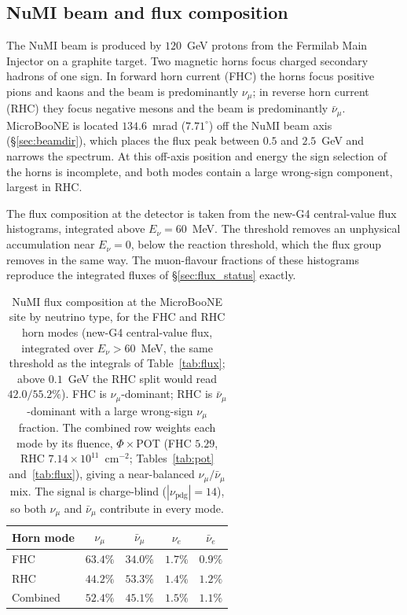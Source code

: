 \documentclass[11pt,a4paper]{article}
\newcommand{\uboone}{MicroBooNE}
\begin{document}
\subsection{NuMI beam and flux composition}

The NuMI beam is produced by $120$~GeV protons from the Fermilab Main Injector on a graphite
target. Two magnetic horns focus charged secondary hadrons of one sign. In forward horn current
(FHC) the horns focus positive pions and kaons and the beam is predominantly $\nu_\mu$; in reverse
horn current (RHC) they focus negative mesons and the beam is predominantly $\bar{\nu}_\mu$.
\uboone{} is located $134.6$~mrad ($7.71^\circ$) off the NuMI beam axis (\S\ref{sec:beamdir}),
which places the flux peak between $0.5$ and $2.5$~GeV and narrows the spectrum. At this off-axis position and energy the sign selection of the horns is
incomplete, and both modes contain a large wrong-sign component, largest in RHC.

The flux composition at the detector is taken from the new-G4 central-value flux histograms,
integrated above $E_\nu=60$~MeV. The threshold removes an unphysical accumulation near
$E_\nu=0$, below the reaction threshold, which the flux group removes in the same way. The
muon-flavour fractions of these histograms reproduce the  integrated fluxes of
\S\ref{sec:flux_status} exactly.

\begin{table}[H]
  \centering
  \caption{NuMI flux composition at the \uboone{} site by neutrino type, for the FHC
    and RHC horn modes (new-G4 central-value flux,
    integrated over $E_\nu>60$~MeV, the same threshold as the integrals of
    Table~\ref{tab:flux}; above $0.1$~GeV the RHC split would read $42.0/55.2\%$). FHC is $\nu_\mu$-dominant; RHC is
    $\bar{\nu}_\mu$-dominant with a large wrong-sign $\nu_\mu$ fraction. The combined
    row weights each mode by its fluence, $\Phi\times$POT (FHC $5.29$, RHC
    $7.14\times10^{11}$~cm$^{-2}$; Tables~\ref{tab:pot} and~\ref{tab:flux}), giving a near-balanced
    $\nu_\mu/\bar{\nu}_\mu$ mix. The signal is charge-blind ($|\nu_\mathrm{pdg}|=14$),
    so both $\nu_\mu$ and $\bar{\nu}_\mu$ contribute in every mode.}
  \label{tab:fluxcomp}
  \begin{tabular}{lcccc}
    \toprule
    Horn mode & $\nu_\mu$ & $\bar{\nu}_\mu$ & $\nu_e$ & $\bar{\nu}_e$ \\
    \midrule
    FHC & $63.4\%$ & $34.0\%$ & $1.7\%$ & $0.9\%$ \\
    RHC & $44.2\%$ & $53.3\%$ & $1.4\%$ & $1.2\%$ \\
    Combined & $52.4\%$ & $45.1\%$ & $1.5\%$ & $1.1\%$ \\
    \bottomrule
  \end{tabular}
\end{table}
\end{document}
